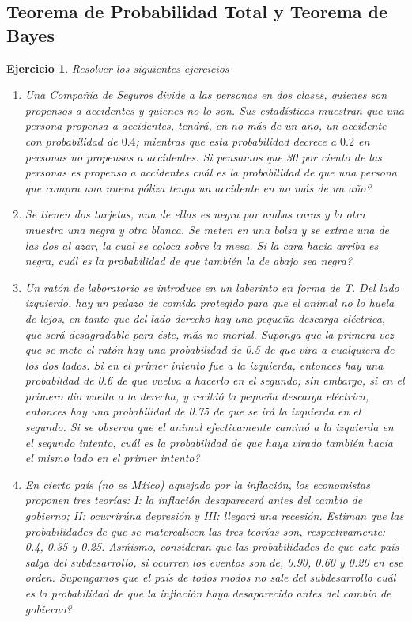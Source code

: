 \documentclass[12pt,twoside]{article}
\newtheorem{Ejer}{Ejercicio}
\begin{document}
\subsection{Teorema de Probabilidad Total y Teorema de Bayes}

\begin{Ejer} Resolver los siguientes ejercicios

\begin{enumerate}

\item Una Compa\~n\'ia de Seguros divide a las personas en dos clases, quienes son propensos a accidentes y quienes no lo son. Sus estad\'isticas muestran que una persona propensa a accidentes, tendr\'a, en no m\'as de un a\~no, un accidente con probabilidad de $0.4$; mientras que esta probabilidad decrece a $0.2$ en personas no propensas a accidentes. Si pensamos que 30 por ciento de las personas es propenso a accidentes cu\'al es la probabilidad de que una persona que compra una nueva p\'oliza tenga un accidente en no m\'as de un a\~no?

\item Se tienen dos tarjetas, una de ellas es negra por ambas caras y la otra muestra una negra y otra blanca. Se meten en una bolsa y se extrae una de las dos al azar, la cual se coloca sobre la mesa. Si la cara hacia arriba es negra,  cu\'al es la probabilidad de que tambi\'en la de abajo sea negra?

\item Un rat\'on de laboratorio se introduce en un laberinto en forma de T. Del lado izquierdo, hay un pedazo de comida protegido para que el animal  no lo huela de lejos, en tanto que del lado derecho hay una peque\~na descarga el\'ectrica, que ser\'a desagradable para \'este, m\'as no mortal. Suponga que la primera vez que se mete el rat\'on hay una probabilidad de 0.5 de que vira a cualquiera de los dos lados. Si en el primer intento fue a la izquierda, entonces hay una probabildad de 0.6 de que vuelva a hacerlo en el segundo; sin embargo, si en el primero dio vuelta a la derecha, y recibi\'o la peque\~na descarga el\'ectrica, entonces hay una probabilidad de 0.75 de que se ir\'a la izquierda en el segundo. Si se observa que el animal efectivamente camin\'o a la izquierda en el segundo intento,  cu\'al es la probabilidad de que haya virado tambi\'en hacia el mismo lado en el primer intento?

\item En cierto pa\'is (no es M\'xico) aquejado por la inflaci\'on, los economistas proponen tres teor\'ias: I: la inflaci\'on desaparecer\'a antes del cambio de gobierno; II: ocurrir\' una depresi\'on y III: llegar\'a una recesi\'on. Estiman que las probabilidades de que se materealicen las tres teor\'ias son, respectivamente: 0.4, 0.35 y 0.25. As\' mismo, consideran que las probabilidades de que este pa\'is salga del subdesarrollo, si ocurren los eventos son de, 0.90, 0.60 y 0.20 en ese orden. Supongamos que el pa\'is de todos modos no sale del subdesarrollo  cu\'al es la probabilidad de que la inflaci\'on haya desaparecido antes del cambio de gobierno?


\end{enumerate}
\end{Ejer}
\end{document}
